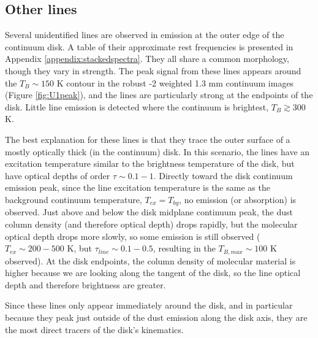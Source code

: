 \documentclass[twocolumn]{aastex61}
\newcommand{\water}{H$_{2}$O\xspace}		%
\begin{document}

\subsection{Other lines}
\label{sec:otherlines}
Several unidentified lines are observed in  emission at the outer edge of the
continuum disk.  A table of their approximate rest frequencies is presented
in Appendix \ref{appendix:stackedspectra}.  They all share a common morphology,
though they vary in strength.  The peak signal from these lines appears around
the $T_B\sim150$ K contour in the robust -2 weighted 1.3 mm continuum images
(Figure \ref{fig:U1peak}), and the lines are particularly strong at the
endpoints of the disk.  Little line emission is detected where the continuum is
brightest, $T_B\gtrsim300$ K.

The best explanation for these lines is that they trace the outer surface of a
mostly optically thick (in the continuum) disk.  In this scenario, the lines
have an excitation temperature similar to the brightness temperature of the
disk, but have optical depths of order $\tau\sim0.1-1$.  Directly toward the
disk continuum emission peak, since the line excitation temperature is the same
as the background continuum temperature, $T_{ex}=T_{bg}$, no emission (or
absorption) is observed.  Just above and below the disk midplane continuum
peak, the dust column density (and therefore optical depth) drops rapidly, but
the molecular optical depth drops more slowly, so some emission is still
observed ($T_{ex}\sim200-500$ K, but $\tau_{line}\sim0.1-0.5$, resulting in the
$T_{B,max} \sim 100$ K observed).  At the disk endpoints, the column density of
molecular material is higher because we are looking along the tangent of the
disk, so the line optical depth and therefore brightness are greater.

Since these lines only appear immediately around the disk, and in particular
because they peak just outside of the dust emission along the disk axis, they
are the most direct tracers of the disk's kinematics.

\end{document}
